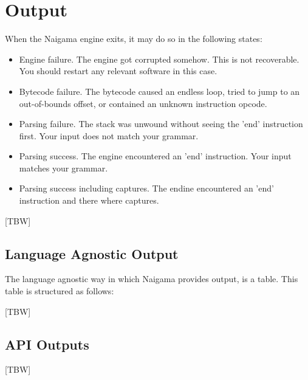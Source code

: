 \section{Output}

When the Naigama engine exits, it may do so in the following states:

\begin{itemize}
\item Engine failure. The engine got corrupted somehow. This is not
      recoverable. You should restart any relevant software in this case.
\item Bytecode failure. The bytecode caused an endless loop, tried
      to jump to an out-of-bounds offset, or contained an unknown
      instruction opcode.
\item Parsing failure. The stack was unwound without seeing the 'end'
      instruction first. Your input does not match your grammar.
\item Parsing success. The engine encountered an 'end' instruction.
      Your input matches your grammar.
\item Parsing success including captures.
      The endine encountered an 'end' instruction and there where
      captures.
\end{itemize}

[TBW]

\subsection{Language Agnostic Output}

The language agnostic way in which Naigama provides output, is a table.
This table is structured as follows:

[TBW]

\subsection{API Outputs}

[TBW]
